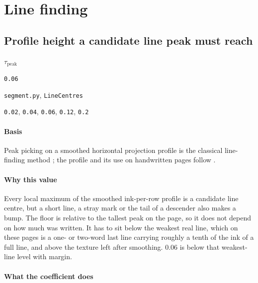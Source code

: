 \section{Line finding}

\subsection{Profile height a candidate line peak must reach}

\label{coef:peak-floor}

\begin{description}[leftmargin=5.2em,style=sameline]

\item[Symbol] $\tau_{\text{peak}}$

\item[Value] \texttt{0.06}

\item[Source] \texttt{segment.py}, \texttt{LineCentres}

\item[Swept] \texttt{0.02}, \texttt{0.04}, \texttt{0.06}, \texttt{0.12}, \texttt{0.2}

\end{description}

\paragraph{Basis}

Peak picking on a smoothed horizontal projection profile is the classical line-finding method \cite{likforman2007}; the profile and its use on handwritten pages follow \cite{marti2002}.

\paragraph{Why this value}

Every local maximum of the smoothed ink-per-row profile is a candidate line centre, but a short line, a stray mark or the tail of a descender also makes a bump. The floor is relative to the tallest peak on the page, so it does not depend on how much was written. It has to sit below the weakest real line, which on these pages is a one- or two-word last line carrying roughly a tenth of the ink of a full line, and above the texture left after smoothing. $0.06$ is below that weakest-line level with margin.

\paragraph{What the coefficient does}

